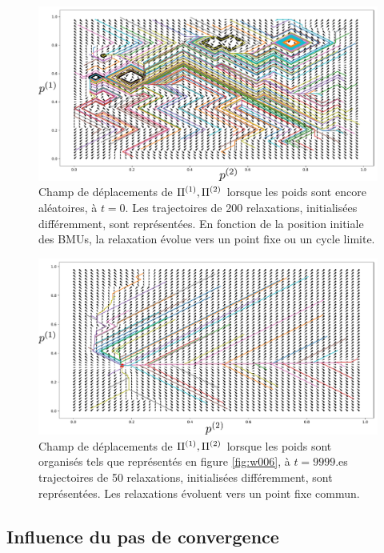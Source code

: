 \begin{figure}
\centering
\includegraphics[width=\textwidth]{champ_006_t1.pdf}
\caption{Champ de déplacements de $\Pi^{({1})},\Pi^{({2})}$ lorsque les poids sont encore aléatoires, à $t=0$. Les trajectoires de 200 relaxations, initialisées différemment, sont représentées. En fonction de la position initiale des BMUs, la relaxation évolue vers un point fixe ou un cycle limite. }
\label{fig:champ_0}
\end{figure}


\begin{figure}
\centering
\includegraphics[width=\textwidth]{champ_006.pdf}
\caption{Champ de déplacements de $\Pi^{({1})},\Pi^{({2})}$ lorsque les poids sont organisés tels que représentés en figure \ref{fig:w006}, à $t=9999$.es trajectoires de 50  relaxations, initialisées différemment, sont représentées. Les relaxations évoluent vers un point fixe commun.}
\label{fig:champ_9999}
\end{figure}

\subsection{Influence du pas de convergence}

